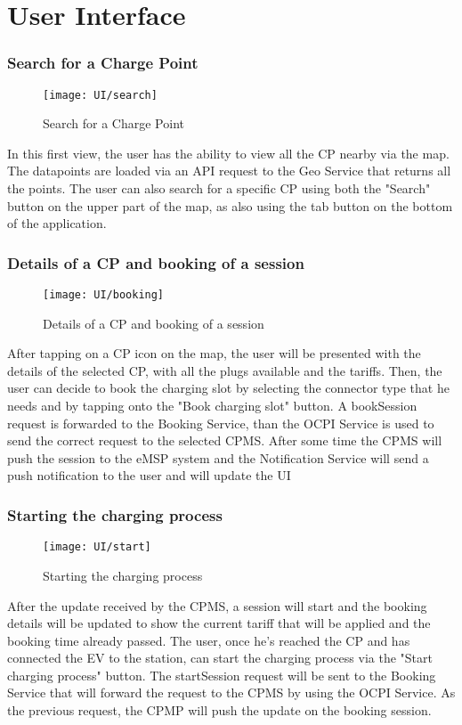 \chapter{User Interface}


\subsection{Search for a Charge Point}
\begin{figure}[h]
\texttt{[image: UI/search]}
\caption{Search for a Charge Point}
\end{figure}
In this first view, the user has the ability to view all the CP nearby via the map. The datapoints are loaded via an API request to the Geo Service that returns all the points. The user can also search for a specific CP using both the "Search" button on the upper part of the map, as also using the tab button on the bottom of the application.


\subsection{Details of a CP and booking of a session}
\begin{figure}[h]
\texttt{[image: UI/booking]}
\caption{Details of a CP and booking of a session}
\end{figure}
After tapping on a CP icon on the map, the user will be presented with the details of the selected CP, with all the plugs available and the tariffs.
Then, the user can decide to book the charging slot by selecting the connector type that he needs and by tapping onto the "Book charging slot" button. 
A bookSession request is forwarded to the Booking Service, than the OCPI Service is used to send the correct request to the selected CPMS.
After some time the CPMS will push the session to the eMSP system and the Notification Service will send a push notification to the user and will update the UI
\clearpage


\subsection{Starting the charging process}
\begin{figure}[h]
\texttt{[image: UI/start]}
\caption{Starting the charging process}
\end{figure}
After the update received by the CPMS, a session will start and the booking details will be updated to show the current tariff that will be applied and the booking time already passed. The user, once he's reached the CP and has connected the EV to the station, can start the charging process via the "Start charging process" button. The startSession request will be sent to the Booking Service that will forward the request to the CPMS by using the OCPI Service. As the previous request, the CPMP will push the update on the booking session.
\clearpage

